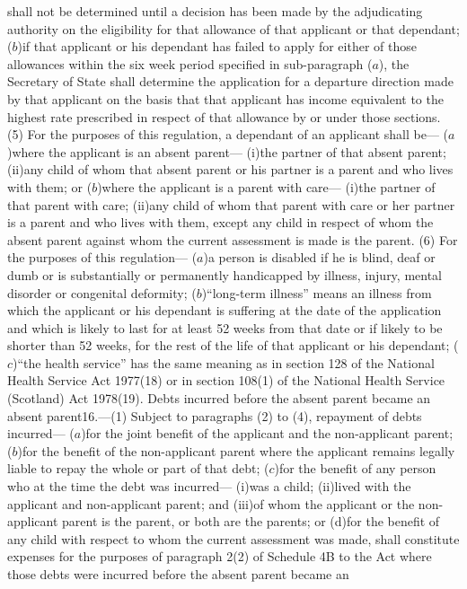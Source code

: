 \documentclass[a4paper]{article}
\begin{document}
shall not be determined until a decision has been made by the adjudicating
authority on the eligibility for that allowance of that applicant or that
dependant;
($b$)if that applicant or his dependant has failed to apply for either of those
allowances within the six week period specified in sub-paragraph ($a$), the
Secretary of State shall determine the application for a departure direction
made by that applicant on the basis that that applicant has income equivalent to
the highest rate prescribed in respect of that allowance by or under those
sections.
(5) For the purposes of this regulation, a dependant of an applicant shall be—
($a$)where the applicant is an absent parent—
(i)the partner of that absent parent;
(ii)any child of whom that absent parent or his partner is a parent and who
lives with them; or
($b$)where the applicant is a parent with care—
(i)the partner of that parent with care;
(ii)any child of whom that parent with care or her partner is a parent and who
lives with them, except any child in respect of whom the absent parent against
whom the current assessment is made is the parent.
(6) For the purposes of this regulation—
($a$)a person is disabled if he is blind, deaf or dumb or is substantially or
permanently handicapped by illness, injury, mental disorder or congenital
deformity;
($b$)“long-term illness” means an illness from which the applicant or his
dependant is suffering at the date of the application and which is likely to
last for at least 52 weeks from that date or if likely to be shorter than 52
weeks, for the rest of the life of that applicant or his dependant;
($c$)“the health service” has the same meaning as in section 128 of the National
Health Service Act 1977(18) or in section 108(1) of the National Health Service
(Scotland) Act 1978(19).
Debts incurred before the absent parent became an absent parent16.—(1) Subject
to paragraphs (2) to (4), repayment of debts incurred—
($a$)for the joint benefit of the applicant and the non-applicant parent;
($b$)for the benefit of the non-applicant parent where the applicant remains
legally liable to repay the whole or part of that debt;
($c$)for the benefit of any person who at the time the debt was incurred—
(i)was a child;
(ii)lived with the applicant and non-applicant parent; and
(iii)of whom the applicant or the non-applicant parent is the parent, or both
are the parents; or
(d)for the benefit of any child with respect to whom the current assessment was
made,
shall constitute expenses for the purposes of paragraph 2(2) of Schedule 4B to
the Act where those debts were incurred before the absent parent became an
\end{document}
